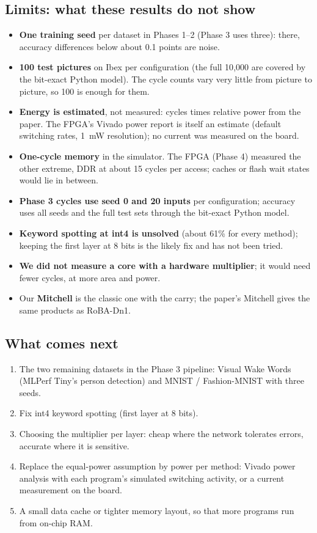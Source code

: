 \subsection{Limits: what these results do not show}

\begin{itemize}
  \item \textbf{One training seed} per dataset in Phases 1--2 (Phase 3 uses three): there, accuracy differences
        below about 0.1 points are noise.
  \item \textbf{100 test pictures} on Ibex per configuration (the full 10{,}000 are covered by the bit-exact
        Python model). The cycle counts vary very little from picture to picture, so 100 is enough for them.
  \item \textbf{Energy is estimated}, not measured: cycles times relative power from the paper. The FPGA's
        Vivado power report is itself an estimate (default switching rates, 1~mW resolution); no current was
        measured on the board.
  \item \textbf{One-cycle memory} in the simulator. The FPGA (Phase 4) measured the other extreme, DDR at about
        15 cycles per access; caches or flash wait states would lie in between.
  \item \textbf{Phase 3 cycles use seed 0 and 20 inputs} per configuration; accuracy uses all seeds and the
        full test sets through the bit-exact Python model.
  \item \textbf{Keyword spotting at int4 is unsolved} (about 61\% for every method); keeping the first layer at
        8 bits is the likely fix and has not been tried.
  \item \textbf{We did not measure a core with a hardware multiplier}; it would need fewer cycles, at more area
        and power.
  \item Our \textbf{Mitchell} is the classic one with the carry; the paper's Mitchell gives the same products as
        RoBA-Dn1.
\end{itemize}

\subsection{What comes next}
\begin{enumerate}
  \item The two remaining datasets in the Phase 3 pipeline: Visual Wake Words (MLPerf Tiny's person detection)
        and MNIST / Fashion-MNIST with three seeds.
  \item Fix int4 keyword spotting (first layer at 8 bits).
  \item Choosing the multiplier per layer: cheap where the network tolerates errors, accurate where it is
        sensitive.
  \item Replace the equal-power assumption by power per method: Vivado power analysis with each program's
        simulated switching activity, or a current measurement on the board.
  \item A small data cache or tighter memory layout, so that more programs run from on-chip RAM.
\end{enumerate}

